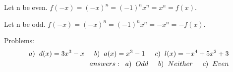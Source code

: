 \documentclass{tufte-handout}
\begin{document}
Let n be even.  $f(-x) = (-x)^n = (-1)^n x^n = x^n = f(x)$.

Let n be odd. $f(-x) = (-x)^n = (-1)^n x^n = -x^n = -f(x)$.

Problems:
\begin{eqnarray}
a) \hspace{2 mm} d(x) = 3x^3 - x \hspace{5mm} b) \hspace{2 mm} a(x) = x^3 - 1 \hspace{5mm} c) \hspace{2mm} l(x) =-x^4 + 5x^2 +3 \\
answers: \hspace{2mm} a) \hspace{2mm} Odd \hspace{5mm} b) \hspace{2mm} Neither \hspace{5mm} c) \hspace{2mm} Even
\end{eqnarray}
\end{document}
